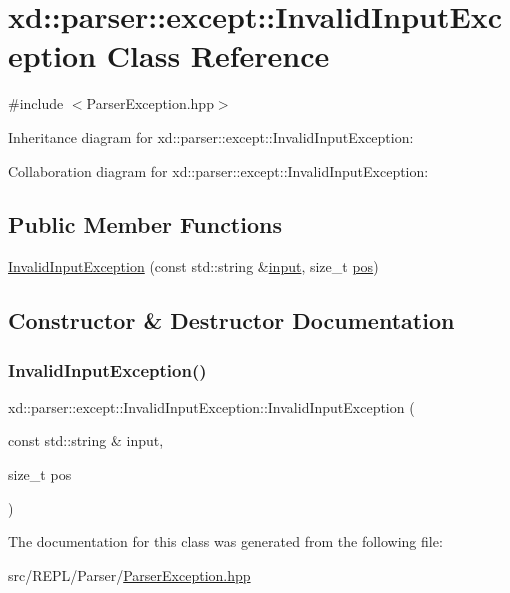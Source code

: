 \hypertarget{classxd_1_1parser_1_1except_1_1_invalid_input_exception}{}\section{xd\+:\+:parser\+:\+:except\+:\+:Invalid\+Input\+Exception Class Reference}
\label{classxd_1_1parser_1_1except_1_1_invalid_input_exception}


{\ttfamily \#include $<$Parser\+Exception.\+hpp$>$}



Inheritance diagram for xd\+:\+:parser\+:\+:except\+:\+:Invalid\+Input\+Exception\+:


Collaboration diagram for xd\+:\+:parser\+:\+:except\+:\+:Invalid\+Input\+Exception\+:
\subsection*{Public Member Functions}
\begin{DoxyCompactItemize}
\item 
\mbox{\hyperlink{classxd_1_1parser_1_1except_1_1_invalid_input_exception_acbbf7105fba74ac182511333a3277afc}{Invalid\+Input\+Exception}} (const std\+::string \&\mbox{\hyperlink{classxd_1_1parser_1_1except_1_1_parser_exception_a6fde0ecef06df6bc2bcaef504269acea}{input}}, size\+\_\+t \mbox{\hyperlink{classxd_1_1parser_1_1except_1_1_parser_exception_ab58b07ce51aef576df0cfe45f0c7e222}{pos}})
\end{DoxyCompactItemize}


\subsection{Constructor \& Destructor Documentation}
\mbox{\label{classxd_1_1parser_1_1except_1_1_invalid_input_exception_acbbf7105fba74ac182511333a3277afc}} 
\subsubsection{\texorpdfstring{Invalid\+Input\+Exception()}{InvalidInputException()}}
{\footnotesize\ttfamily xd\+::parser\+::except\+::\+Invalid\+Input\+Exception\+::\+Invalid\+Input\+Exception (\begin{DoxyParamCaption}\item[{const std\+::string \&}]{input,  }\item[{size\+\_\+t}]{pos }\end{DoxyParamCaption})\hspace{0.3cm}{\ttfamily [inline]}}



The documentation for this class was generated from the following file\+:\begin{DoxyCompactItemize}
\item 
src/\+R\+E\+P\+L/\+Parser/\mbox{\hyperlink{_parser_exception_8hpp}{Parser\+Exception.\+hpp}}\end{DoxyCompactItemize}
